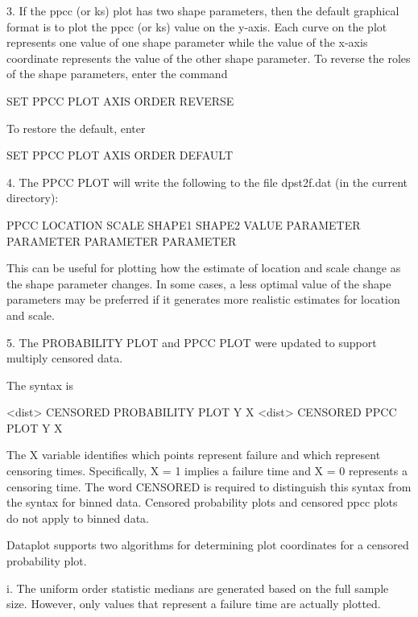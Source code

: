 {       3. If the ppcc (or ks) plot has two shape parameters, then
          the default graphical format is to plot the ppcc (or
          ks) value on the y-axis.  Each curve on the plot
          represents one value of one shape parameter while the
          value of the x-axis coordinate represents the value of
          the other shape parameter.  To reverse the roles of the
          shape parameters, enter the command
 
              SET PPCC PLOT AXIS ORDER REVERSE
 
          To restore the default, enter
 
              SET PPCC PLOT AXIS ORDER DEFAULT
 
       4. The PPCC PLOT will write the following to the file
          dpst2f.dat (in the current directory):

            PPCC   LOCATION    SCALE       SHAPE1      SHAPE2
            VALUE  PARAMETER   PARAMETER   PARAMETER   PARAMETER

          This can be useful for plotting how the estimate of location
          and scale change as the shape parameter changes.  In some
          cases, a less optimal value of the shape parameters may
          be preferred if it generates more realistic estimates for
          location and scale.

       5. The PROBABILITY PLOT and PPCC PLOT were updated to support
          multiply censored data.

          The syntax is

              <dist> CENSORED PROBABILITY PLOT Y X
              <dist> CENSORED PPCC PLOT Y X

          The X variable identifies which points represent failure
          and which represent censoring times.  Specifically,
          X = 1 implies a failure time and X = 0 represents a
          censoring time.  The word CENSORED is required to
          distinguish this syntax from the syntax for binned
          data.  Censored probability plots and censored ppcc
          plots do not apply to binned data.

          Dataplot supports two algorithms for determining plot
          coordinates for a censored probability plot.

           i. The uniform order statistic medians are generated
              based on the full sample size.  However, only
              values that represent a failure time are actually
              plotted.

}
